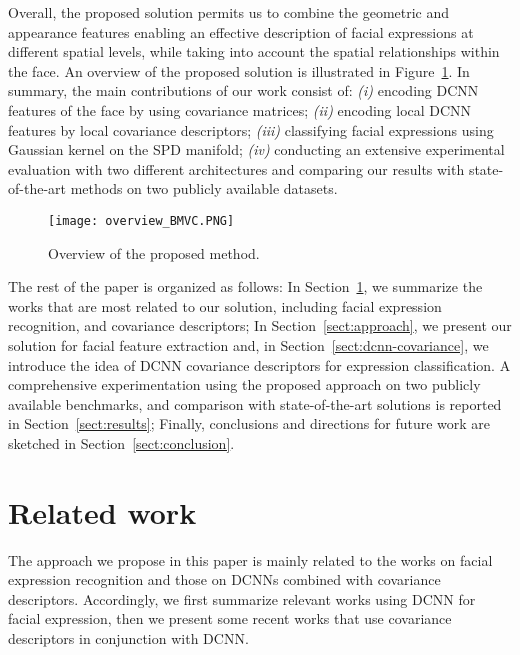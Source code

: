 \documentclass{bmvc2k}
\begin{document}
Overall, the proposed solution permits us to combine the geometric and appearance features enabling an effective description of  facial expressions at different spatial levels, while taking into account the spatial relationships within the face. An overview of the proposed solution is illustrated in Figure~\ref{fig:method-overview}. 
In summary, the main contributions of our work consist of: \textit{(i)} encoding DCNN features of the face by using covariance matrices; \textit{(ii)} encoding local DCNN features by local covariance descriptors; \textit{(iii)} classifying facial expressions using Gaussian kernel on the SPD manifold; \textit{(iv)} conducting an extensive experimental evaluation with two different architectures and comparing our results with state-of-the-art methods on two publicly available datasets.

\begin{figure}[!th]
\centering
\texttt{[image: overview\_BMVC.PNG]}
\centering
\caption{Overview of the proposed method.}
\label{fig:method-overview}
\end{figure}

The rest of the paper is organized as follows: In Section~\ref{sect:related-work}, we summarize the works that are most related to our solution, including facial expression recognition, and covariance descriptors; In Section~\ref{sect:approach}, we present our solution for facial feature extraction and, in Section~\ref{sect:dcnn-covariance}, we introduce the idea of DCNN covariance descriptors for expression classification. A comprehensive experimentation using the proposed approach on two publicly available benchmarks, and comparison with state-of-the-art solutions is reported in Section~\ref{sect:results}; Finally, conclusions and directions for future work are sketched in Section~\ref{sect:conclusion}.

\section{Related work}\label{sect:related-work}
The approach we propose in this paper is mainly related to the works on facial expression recognition and those on DCNNs combined with covariance descriptors. Accordingly, we first summarize relevant works using DCNN for facial expression, then we present some recent works that use covariance descriptors in conjunction with DCNN.
\end{document}
